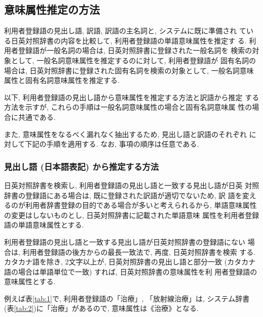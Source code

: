 \subsection{意味属性推定の方法}
\label{sec:3.3}

利用者登録語の見出し語, 訳語, 訳語の主名詞と, システムに既に準備され
ている日英対照辞書の内容を比較して, 利用者登録語の単語意味属性を推定す
る. 利用者登録語が一般名詞の場合は, 日英対照辞書に登録された一般名詞を
検索の対象として, 一般名詞意味属性を推定するのに対して, 利用者登録語が
固有名詞の場合は, 日英対照辞書に登録された固有名詞を検索の対象として, 
一般名詞意味属性と固有名詞意味属性を推定する.  \vspace{-0.1mm}

以下, 利用者登録語の見出し語から意味属性を推定する方法と訳語から推定
する方法を示すが, これらの手順は一般名詞意味属性の場合と固有名詞意味属
性の場合に共通である.  \vspace{-0.1mm}

また, 意味属性をなるべく漏れなく抽出するため, 見出し語と訳語のそれぞれ
に対して下記の手順を適用する. なお, 事項の順序は任意である. 
\vspace{-0.2mm}
\subsubsection{見出し語 (日本語表記) から推定する方法}
\vspace{-0.2mm}
日英対照辞書を検索し, 利用者登録語の見出し語と一致する見出し語が日英
対照辞書の登録語にある場合は, 既に登録された訳語が適切でないため, 訳
語を変えるのが利用者辞書登録の目的である場合が多いと考えられるから, 
単語意味属性の変更はしないものとし, 日英対照辞書に記載された単語意味
属性を利用者登録語の単語意味属性とする. \vspace{-0.1mm}

利用者登録語の見出し語と一致する見出し語が日英対照辞書の登録語にない
場合は, 利用者登録語の後方からの最長一致法で, 再度, 日英対照辞書を検索
する. カタカナ語を除き, 2文字以上が, 日英対照辞書の見出し語と部分一致
 (カタカナ語の場合は単語単位で一致) すれば, 日英対照辞書の意味属性を利
用者登録語の意味属性とする. \vspace{-0.1mm}

例えば表\ref{tab:1}で, 利用者登録語の「治療」, 「放射線治療」は, 
システム辞書 (表\ref{tab:2})に「治療」があるので, 意味属性は《治療》となる. \vspace{-0.1mm}

